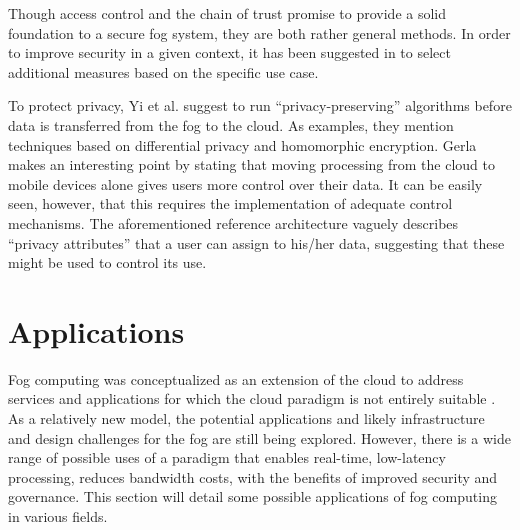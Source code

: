 \documentclass{article}
\begin{document}
Though access control and the chain of trust promise to provide a solid foundation to a secure fog system, they are both rather general methods. In order to improve security in a given context, it has been suggested in \cite{openfogconsortium2017} to select additional measures based on the specific use case.

To protect privacy, Yi et al. \cite{yi2015survey} suggest to run ``privacy-preserving'' algorithms before data is transferred from the fog to the cloud. As examples, they mention techniques based on differential privacy and homomorphic encryption. Gerla \cite{gerla2012vehicular} makes an interesting point by stating that moving processing from the cloud to mobile devices alone gives users more control over their data. It can be easily seen, however, that this requires the implementation of adequate control mechanisms. The aforementioned reference architecture \cite{openfogconsortium2017} vaguely describes ``privacy attributes'' that a user can assign to his/her data, suggesting that these might be used to control its use.

\pagebreak

\section{Applications}

Fog computing was conceptualized as an extension of the cloud to address services and applications for which the cloud paradigm is not entirely suitable \cite{bessis2014big}. As a relatively new model, the potential applications and likely infrastructure and design challenges for the fog are still being explored. However, there is a wide range of possible uses of a paradigm that enables real-time, low-latency processing, reduces bandwidth costs, with the benefits of improved security and governance. This section will detail some possible applications of fog computing in various fields.
\end{document}
